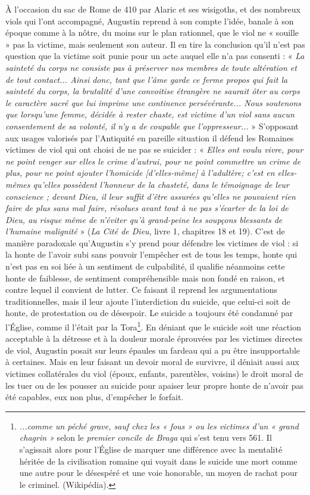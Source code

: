   À l'occasion du sac de Rome de 410 par Alaric et ses wisigoths,  et des nombreux viols qui l'ont accompagné, Augustin reprend à son compte l'idée, banale à son époque comme à la nôtre, du moins sur le plan rationnel, que le viol ne « souille » pas la victime, mais seulement son auteur. Il en tire la conclusion qu'il n'est pas question que la victime soit punie pour un acte auquel elle n'a pas consenti : « \emph{La sainteté du corps ne consiste pas à préserver nos membres de toute altération et de tout contact... Ainsi donc, tant que l'âme garde ce ferme propos qui fait la sainteté du corps, la brutalité d'une convoitise étrangère ne saurait ôter au corps le caractère sacré que lui imprime une continence persévérante... Nous soutenons que lorsqu'une femme, décidée à rester chaste, est victime d'un viol sans aucun consentement de sa volonté, il n'y a de coupable que l'oppresseur...} »
S'opposant aux usages valorisés par l'Antiquité en pareille situation il défend les Romaines victimes de viol qui ont choisi de ne pas se suicider : « \emph{Elles ont voulu vivre, pour ne point venger sur elles le crime d'autrui, pour ne point commettre un crime de plus, pour ne point ajouter l'homicide \emph{[d'elles-même]} à l'adultère; c'est en elles-mêmes qu'elles possèdent l'honneur de la chasteté, dans le témoignage de leur conscience ; devant Dieu, il leur suffit d'être assurées qu'elles ne pouvaient rien faire de plus sans mal faire, résolues avant tout à ne pas s'écarter de la loi de Dieu, au risque même de n'éviter qu'à grand-peine les soupçons blessants de l'humaine malignité} » (\emph{La Cité de Dieu}, livre 1, chapitres 18 et 19). C'est de manière paradoxale qu'Augustin s'y prend pour défendre les victimes de viol : si la honte de l'avoir subi sans pouvoir l'empêcher est de tous les temps, honte qui n'est pas en soi liée à un sentiment de culpabilité, il qualifie néanmoins cette honte de faiblesse, de sentiment compréhensible mais non fondé en raison, et contre lequel il convient de lutter. Ce faisant il reprend les argumentations traditionnelles, mais il leur ajoute l'interdiction du suicide, que celui-ci soit de honte, de protestation ou de désespoir. 
Le suicide a toujours été condamné par l'Église, comme il l'était par la Tora\footnote{\emph{...comme un péché grave, sauf chez les « fous » ou les victimes d'un « grand chagrin »} selon le \emph{premier concile de Braga} qui s'est tenu vers 561. Il s'agissait alors pour l'Église de marquer une différence avec la mentalité héritée de la civilisation romaine qui voyait dans le suicide une mort comme une autre pour le désespéré et une voie honorable, un moyen de rachat pour le criminel. (Wikipédia). }. En déniant que le suicide soit une réaction acceptable à la détresse et à la douleur morale éprouvées par les victimes directes de viol, Augustin posait sur leurs épaules un fardeau qui a pu être insupportable à certaines. Mais en leur faisant un devoir moral de survivre, il déniait aussi aux victimes collatérales du viol (époux, enfants, parentèles, voisins) le droit moral de les tuer ou de les pousser au suicide pour apaiser leur propre honte de n'avoir pas été capables, eux non plus, d'empêcher le forfait.
 



